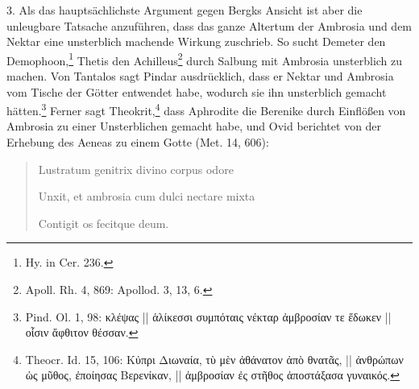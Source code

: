 \documentclass[a4paper, 11pt, oneside]{article}
\begin{document}
3. Als das hauptsächlichste Argument gegen Bergks Ansicht ist aber die unleugbare Tatsache anzuführen, dass das ganze Altertum der Ambrosia und dem Nektar eine unsterblich machende Wirkung zuschrieb. So sucht Demeter den Demophoon,\footnote{Hy. in Cer. 236.} Thetis den Achilleus\footnote{Apoll. Rh. 4, 869: Apollod. 3, 13, 6.} durch Salbung mit Ambrosia unsterblich zu machen. Von Tantalos sagt Pindar ausdrücklich, dass er Nektar und Ambrosia vom Tische der Götter entwendet habe, wodurch sie ihn unsterblich gemacht hätten.\footnote{Pind. Ol. 1, 98: κλέψας || ἁλίκεσσι συμπόταις νέκταρ ἀμβροσίαν τε ἔδωκεν || οἷσιν ἄφθιτον θέσσαν.} Ferner sagt Theokrit,\footnote{Theocr. Id. 15, 106: Κύπρι Διωναία, τὺ μὲν ἀθάνατον ἀπὸ θνατᾶς, || ἀνθρώπων ὡς μῦθος, ἐποίησας Βερενίκαν, || ἀμβροσίαν ἐς στῆθος ἀποστάξασα γυναικός.} dass Aphrodite die Berenike durch Einflößen von Ambrosia zu einer Unsterblichen gemacht habe, und Ovid berichtet von der Erhebung des Aeneas zu einem Gotte (Met. 14, 606):
\begin{quotation}
Lustratum genitrix divino corpus odore

Unxit, et ambrosia cum dulci nectare mixta

Contigit os fecitque deum.
\end{quotation}
\end{document}
